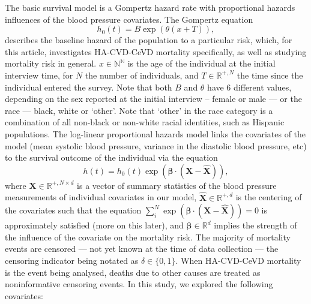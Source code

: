 \documentclass[
]{article}
\begin{document}
The basic survival model is a Gompertz hazard rate with proportional hazards influences of the blood pressure covariates.
The Gompertz equation
\begin{equation}\label{gompertz}
h_0(t)=B\exp{\left(\theta(x+T)\right)},
\end{equation}
describes the baseline hazard of the population to a particular risk, which, for this article, investigates HA-CVD-CeVD mortality specifically, as well as studying mortality risk in general. \(x\in\mathbb{N^N}\) is the age of the individual at the initial interview time, for \(N\) the number of individuals, and \(T\in\mathbb{R}^{+,N}\) the time since the individual entered the survey.
Note that both \(B\) and \(\theta\) have 6 different values, depending on the sex reported at the initial interview -- female or male --- or the race --- black, white or `other'.
Note that `other' in the race category is a combination of all non-black or non-white racial identities, such as Hispanic populations.
The log-linear proportional hazards model links the covariates of the model (mean systolic blood pressure, variance in the diastolic blood pressure, etc) to the survival outcome of the individual via the equation
\begin{equation}\label{prophaz}
h(t)=h_0(t)\exp{\left(\boldsymbol{\beta}\cdot(\boldsymbol{X}-\hat{\boldsymbol{X}})\right)},
\end{equation}
where \(\boldsymbol{X}\in\mathbb{R}^{+,N\times d}\) is a vector of summary statistics of the blood pressure measurements of individual covariates in our model, \(\hat{\boldsymbol{X}}\in\mathbb{R}^{+,d}\) is the centering of the covariates such that the equation \(\sum_i^N \exp{(\boldsymbol{\beta}\cdot(\boldsymbol{X}-\hat{\boldsymbol{X}}))}=0\) is approximately satisfied (more on this later), and \(\boldsymbol{\beta}\in\mathbb{R}^d\) implies the strength of the influence of the covariate on the mortality risk.
The majority of mortality events are censored --- not yet known at the time of data collection --- the censoring indicator being notated as \(\delta\in \{0,1\}\).
When HA-CVD-CeVD mortality is the event being analysed, deaths due to other causes are treated as noninformative censoring events.
In this study, we explored the following covariates:
\end{document}
